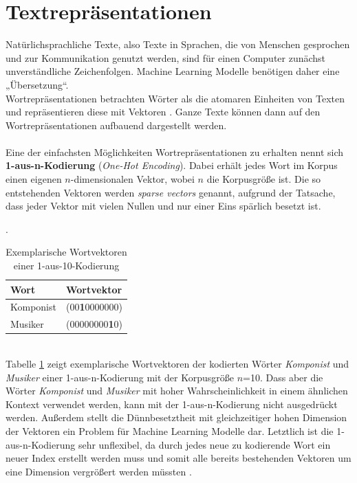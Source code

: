 \documentclass[ngerman]{ttlab-qualify}
\begin{document}
\section{Textrepräsentationen} \label{Textrepräsentation}
Natürlichsprachliche Texte, also Texte in Sprachen, die von Menschen gesprochen und zur Kommunikation genutzt werden, sind für einen Computer zunächst unverständliche Zeichenfolgen. Machine Learning Modelle benötigen daher eine „Übersetzung“.\\ 
Wortrepräsentationen betrachten Wörter als die atomaren Einheiten von Texten und repräsentieren diese mit Vektoren \parencite{Liu2020}. Ganze Texte können dann auf den Wortrepräsentationen aufbauend dargestellt werden.\\
\\
Eine der einfachsten Möglichkeiten Wortrepräsentationen zu erhalten nennt sich \textbf{1-aus-n-Kodierung} (\textit{One-Hot Encoding}). Dabei erhält jedes Wort im Korpus einen eigenen $n$-dimensionalen Vektor, wobei $n$ die Korpusgröße ist. Die so entstehenden Vektoren werden \textit{sparse vectors} genannt, aufgrund der Tatsache, dass jeder Vektor mit vielen Nullen und nur einer Eins spärlich besetzt ist.
\begin{table}[htb]
    \centering
    \caption{Exemplarische Wortvektoren einer 1-aus-10-Kodierung}.
    \begin{tabular}[h]{ll}
    \toprule
    Wort & Wortvektor\\
    \midrule
    Komponist & (00\textbf{1}0000000)\\
    Musiker & (00000000\textbf{1}0)\\
    \bottomrule
    \end{tabular} 
    \label{tab:1-aus-n}
\end{table}\\
\noindent Tabelle \ref{tab:1-aus-n} zeigt exemplarische Wortvektoren der kodierten Wörter \textit{Komponist} und \textit{Musiker} einer 1-aus-n-Kodierung mit der Korpusgröße $n$=10. Dass aber die Wörter \textit{Komponist} und \textit{Musiker} mit hoher Wahrscheinlichkeit in einem ähnlichen Kontext verwendet werden, kann mit der 1-aus-n-Kodierung nicht ausgedrückt werden. Außerdem stellt die Dünnbesetztheit mit gleichzeitiger hohen Dimension der Vektoren ein Problem für Machine Learning Modelle dar. Letztlich ist die 1-aus-n-Kodierung sehr unflexibel, da durch jedes neue zu kodierende Wort ein neuer Index erstellt werden muss und somit alle bereits bestehenden Vektoren um eine Dimension vergrößert werden müssten \parencite{Liu2020}.
\end{document}
